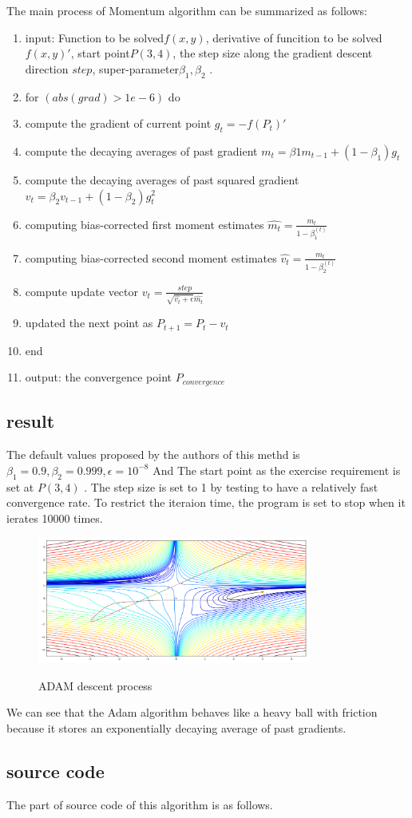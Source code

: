 \documentclass[aps,letterpaper,10pt]{article}
\begin{document}
  The main process of Momentum algorithm can be summarized as follows:

  \begin{enumerate}
  	\item input: Function to be solved$f(x,y)$, derivative of funcition to be solved${f(x,y)}'$, start point$P(3,4)$, the step size along the gradient descent direction $step$, super-parameter$\beta_1,\beta_2$ .
  	\item for $(abs(grad)> 1e-6)$ do
  	\item compute the gradient of current point $g_t=-{f(P_t)}'$
    \item compute the decaying averages of past gradient $m_t=\beta1 m_{t-1} +(1-\beta_1)g_t$
    \item compute the decaying averages of past squared gradient $v_t=\beta_2 v_{t-1} +(1-\beta_2)g_t^{2}$
    \item computing bias-corrected first moment estimates $\hat{m_t}=\frac{m_t}{1-\beta_1^(t)}$
    \item computing bias-corrected second moment estimates $\hat{v_t}=\frac{m_t}{1-\beta_2^(t)}$
    \item compute update vector $v_t=\frac{step}{\sqrt{\hat{v_t}+\epsilon}\hat{m_t}} $
    \item updated the next point as $P_{t+1}=P_t - v_t$
    \item end
  	\item output: the convergence point $P_{convergence}$
  \end{enumerate}




  \subsection{result}
  The default values proposed by the authors of this methd is $\beta_1=0.9, \beta_2=0.999, \epsilon=10^{-8}$
  And The start point as the exercise requirement is set at $P(3,4)$ . The step size is set to 1 by testing to have a relatively fast convergence rate. To restrict the iteraion time, the program is set to stop when it ierates 10000 times.

    \begin{figure}[H]
    	 \centering
    	 \label{fig:adam}\includegraphics[width=0.8\textwidth]{adam.png}\
    	 \caption{ADAM descent process}
    \end{figure}
  We can see that the Adam algorithm behaves like a heavy ball with friction because it stores an exponentially decaying average of past gradients.


    \subsection{source code}
    The part of source code of this algorithm is as follows.  \vspace{5mm}
    	
    	\vspace{3mm}

\newpage
\listoffigures
\end{document}
